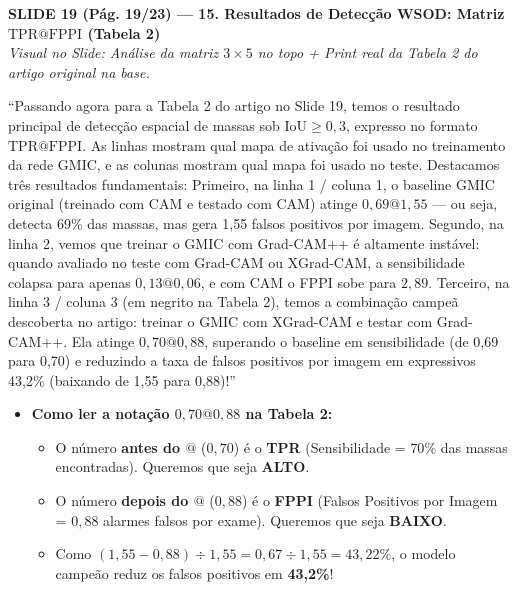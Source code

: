 \documentclass[11pt,a4paper]{article}
\newcommand{\slideheader}[3]{%
    \vspace{10pt}%
    \begin{tcolorbox}[colback=slateborder, colframe=slateborder, coltext=white, boxrule=0pt, arc=3pt, left=8pt, right=8pt, top=5pt, bottom=5pt]
        {\large\bfseries #1 — #2}\\[2pt]
        {\small\itshape Visual no Slide: #3}
    \end{tcolorbox}%
}
\newenvironment{falabox}{%
    \begin{tcolorbox}[colback=speechbg, colframe=speechborder, boxrule=1.2pt, arc=4pt, left=10pt, right=10pt, top=8pt, bottom=8pt, title={\bfseries O QUE VOCÊ DEVE FALAR (Fala Sugerida)}]%
}{%
    \end{tcolorbox}%
}
\newenvironment{explicabox}{%
    \begin{tcolorbox}[colback=explainbg, colframe=explainborder, boxrule=0.8pt, arc=4pt, left=10pt, right=10pt, top=8pt, bottom=8pt, title={\bfseries ENTENDA O QUE VOCÊ ESTÁ FALANDO (Explicação Didática de Cada Termo)}]%
}{%
    \end{tcolorbox}%
}
\begin{document}
\newpage
\slideheader{SLIDE 19 (Pág. 19/23)}{15. Resultados de Detecção WSOD: Matriz $\text{TPR}@\text{FPPI}$ (Tabela 2)}{Análise da matriz $3\times 5$ no topo + Print real da Tabela 2 do artigo original na base.}

\begin{falabox}
``Passando agora para a Tabela 2 do artigo no Slide 19, temos o resultado principal de detecção espacial de massas sob $\text{IoU} \ge 0{,}3$, expresso no formato $\text{TPR}@\text{FPPI}$. As linhas mostram qual mapa de ativação foi usado no treinamento da rede GMIC, e as colunas mostram qual mapa foi usado no teste. Destacamos três resultados fundamentais:
Primeiro, na linha 1 / coluna 1, o baseline GMIC original (treinado com CAM e testado com CAM) atinge $0{,}69@1{,}55$ — ou seja, detecta 69\% das massas, mas gera 1,55 falsos positivos por imagem.
Segundo, na linha 2, vemos que treinar o GMIC com Grad-CAM++ é altamente instável: quando avaliado no teste com Grad-CAM ou XGrad-CAM, a sensibilidade colapsa para apenas $0{,}13@0{,}06$, e com CAM o FPPI sobe para $2{,}89$.
Terceiro, na linha 3 / coluna 3 (em negrito na Tabela 2), temos a combinação campeã descoberta no artigo: treinar o GMIC com XGrad-CAM e testar com Grad-CAM++. Ela atinge $0{,}70@0{,}88$, superando o baseline em sensibilidade (de 0,69 para 0,70) e reduzindo a taxa de falsos positivos por imagem em expressivos 43,2\% (baixando de 1,55 para 0,88)!''
\end{falabox}

\begin{explicabox}
\begin{itemize}[leftmargin=*, itemsep=4pt]
    \item \textbf{Como ler a notação $0{,}70@0{,}88$ na Tabela 2:}
    \begin{itemize}
        \item O número \textbf{antes do $@$} ($0{,}70$) é o \textbf{TPR} (Sensibilidade = $70\%$ das massas encontradas). Queremos que seja \textbf{ALTO}.
        \item O número \textbf{depois do $@$} ($0{,}88$) é o \textbf{FPPI} (Falsos Positivos por Imagem = $0{,}88$ alarmes falsos por exame). Queremos que seja \textbf{BAIXO}.
        \item Como $(1{,}55 - 0{,}88) \div 1{,}55 = 0{,}67 \div 1{,}55 = 43{,}22\%$, o modelo campeão reduz os falsos positivos em \textbf{43,2\%}!
    \end{itemize}
\end{itemize}
\end{explicabox}
\end{document}
